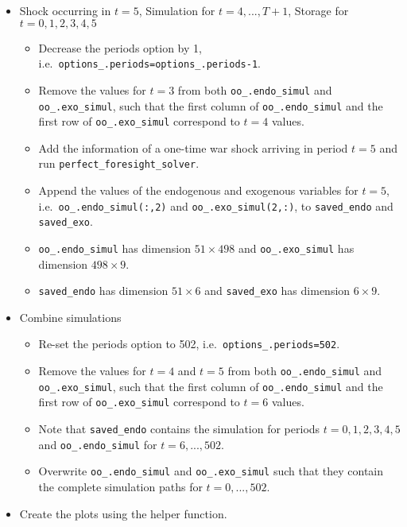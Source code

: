 \documentclass{article}
\begin{document}
\begin{enumerate}
\begin{itemize}
    \item Shock occurring in $t=5$, Simulation for $t=4,...,T+1$, Storage for $t=0,1,2,3,4,5$
    \begin{itemize}
      \item Decrease the periods option by 1, i.e.\ \texttt{options\_.periods=options\_.periods-1}.
      \item Remove the values for $t=3$ from both \texttt{oo\_.endo\_simul} and \texttt{oo\_.exo\_simul},
      such that the first column of \texttt{oo\_.endo\_simul} and the first row of \texttt{oo\_.exo\_simul} correspond to $t=4$ values.
      \item Add the information of a one-time war shock arriving in period $t=5$ and run \texttt{perfect\_foresight\_solver}.
      \item Append the values of the endogenous and exogenous variables for $t=5$,\\
        i.e.\ \texttt{oo\_.endo\_simul(:,2)} and \texttt{oo\_.exo\_simul(2,:)},
        to \texttt{saved\_endo} and \texttt{saved\_exo}.
      \item \texttt{oo\_.endo\_simul} has dimension $51 \times 498$ and \texttt{oo\_.exo\_simul} has dimension $498 \times 9$.
      \item \texttt{saved\_endo} has dimension $51 \times 6$ and \texttt{saved\_exo} has dimension $6 \times 9$.
    \end{itemize}

    \item Combine simulations
    \begin{itemize}
      \item Re-set the periods option to 502, i.e.\ \texttt{options\_.periods=502}.
      \item Remove the values for $t=4$ and $t=5$ from both \texttt{oo\_.endo\_simul} and \texttt{oo\_.exo\_simul},
      such that the first column of \texttt{oo\_.endo\_simul} and the first row of \texttt{oo\_.exo\_simul} correspond to $t=6$ values.
      \item Note that \texttt{saved\_endo} contains the simulation for periods $t=0,1,2,3,4,5$ and \texttt{oo\_.endo\_simul} for $t=6,...,502$.
      \item Overwrite \texttt{oo\_.endo\_simul} and \texttt{oo\_.exo\_simul} such that they contain the complete simulation paths for $t=0,...,502$.      
    \end{itemize}
    \item Create the plots using the helper function.
    
\end{itemize}

\end{enumerate}
\end{document}
